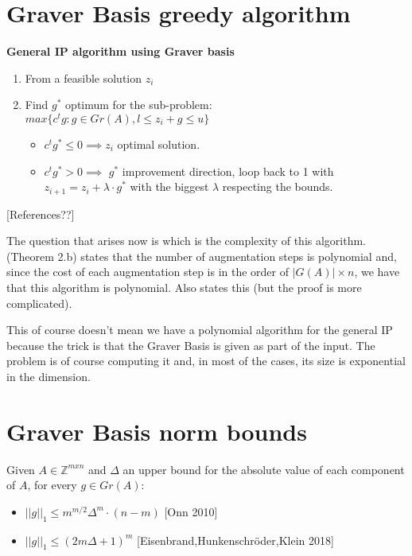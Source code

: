 \section{Graver Basis greedy algorithm}

\textbf{General IP algorithm using Graver basis}
\begin{enumerate}
    \item From a feasible solution $z_i$
    \item Find $g^*$ optimum for the sub-problem: \vspace{4pt}\\
          $max\{c^tg : g \in Gr(A), l \leq z_i + g \leq u \}$ \vspace{4pt}
    \begin{itemize}
        \item $c^tg^* \leq 0 \implies z_i$ optimal solution.
        \item $c^tg^* > 0 \implies$ $g^*$ improvement direction, loop back to 1 with $z_{i+1} = z_i + \lambda \cdot g^*$ with the biggest $\lambda$ respecting the bounds.
    \end{itemize}
\end{enumerate}
\hspace{15pt} [References??]


The question that arises now is which is the complexity of this algorithm. \cite{HOW:2009} (Theorem 2.b) states that the number of augmentation steps is polynomial and, since the cost of each augmentation step is in the order of $|G(A)|\times n$, we have that this algorithm is polynomial. Also \cite{LHOW:2006} states this (but the proof is more complicated).

This of course doesn't mean we have a polynomial algorithm for the general IP because the trick is that the Graver Basis is given as part of the input. The problem is of course computing it and, in most of the cases, its size is exponential in the dimension.


\section{Graver Basis norm bounds}

\begin{proposition}
Given $A \in \mathbb{Z}^{mxn}$ and $\Delta$ an upper bound for the absolute value of each component of $A$, for every $g \in Gr(A)$:
\begin{itemize}
    \item $||g||_1 \leq m^{m/2}\Delta^m\cdot(n - m)$ \hspace{10pt}[Onn 2010]
    \item $||g||_1 \leq (2m \Delta + 1)^m$ \hspace{41pt}[Eisenbrand,Hunkenschröder,Klein 2018]
\end{itemize}
\end{proposition}

